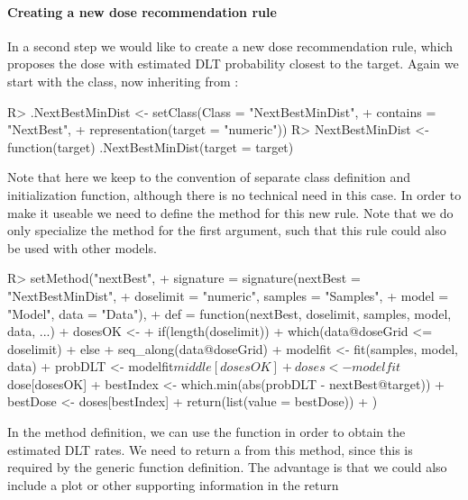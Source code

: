 \documentclass[article]{jss}\usepackage[]{graphicx}\usepackage[]{color}
\begin{document}
\paragraph{Creating a new dose recommendation rule} 
In a second step we would like to create a new dose recommendation rule, which
proposes the dose with estimated DLT probability closest to the target. Again
we start with the class, now inheriting from :
\begin{Schunk}
\begin{Sinput}
R> .NextBestMinDist <- setClass(Class = "NextBestMinDist", 
+                               contains = "NextBest",
+                               representation(target = "numeric"))
R> NextBestMinDist <- function(target){ .NextBestMinDist(target = target) }
\end{Sinput}
\end{Schunk}
Note that here we keep to the convention of separate class definition and 
initialization function, although there is no technical need in this case. 
In order to make it useable we need to define the  method for this
new rule. Note that we do only specialize the method for the first argument, 
such that this rule could also be used with other models.
\begin{Schunk}
\begin{Sinput}
R> setMethod("nextBest", 
+            signature = signature(nextBest = "NextBestMinDist",
+                                  doselimit = "numeric", samples = "Samples",
+                                  model = "Model", data = "Data"),
+            def = function(nextBest, doselimit, samples, model, data, ...){
+              dosesOK <-
+                  if(length(doselimit))
+                    which(data@doseGrid <= doselimit)
+                else
+                  seq_along(data@doseGrid)
+                modelfit <- fit(samples, model, data)
+                probDLT <- modelfit$middle[dosesOK]
+                doses <- modelfit$dose[dosesOK]
+                bestIndex <- which.min(abs(probDLT - nextBest@target))
+                bestDose <- doses[bestIndex]
+                return(list(value = bestDose))
+              })
\end{Sinput}
\end{Schunk}
In the method definition, we can use the  function in order to obtain
the estimated DLT rates. We need to return a  from this method, 
since this is required by the generic function definition. The advantage is 
that we could also include a plot or other supporting information in the return 
\end{document}
